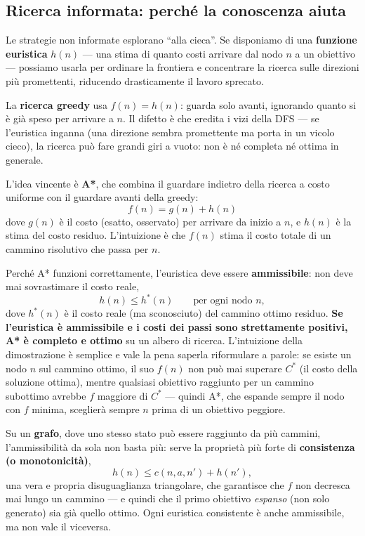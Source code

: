 \documentclass[11pt,a4paper]{article}
\begin{document}
\subsection{Ricerca informata: perché la conoscenza aiuta}

Le strategie non informate esplorano ``alla cieca''. Se disponiamo di una \textbf{funzione euristica} $h(n)$ --- una stima di quanto costi arrivare dal nodo $n$ a un obiettivo --- possiamo usarla per ordinare la frontiera e concentrare la ricerca sulle direzioni più promettenti, riducendo drasticamente il lavoro sprecato.

La \textbf{ricerca greedy} usa $f(n)=h(n)$: guarda solo avanti, ignorando quanto si è già speso per arrivare a $n$. Il difetto è che eredita i vizi della DFS --- se l'euristica inganna (una direzione sembra promettente ma porta in un vicolo cieco), la ricerca può fare grandi giri a vuoto: non è né completa né ottima in generale.

L'idea vincente è \textbf{A*}, che combina il guardare indietro della ricerca a costo uniforme con il guardare avanti della greedy:
\[
f(n) = g(n) + h(n)
\]
dove $g(n)$ è il costo (esatto, osservato) per arrivare da inizio a $n$, e $h(n)$ è la stima del costo residuo. L'intuizione è che $f(n)$ stima il costo totale di un cammino risolutivo che passa per $n$.

Perché A* funzioni correttamente, l'euristica deve essere \textbf{ammissibile}: non deve mai sovrastimare il costo reale,
\[
h(n) \le h^*(n) \qquad \text{per ogni nodo } n,
\]
dove $h^*(n)$ è il costo reale (ma sconosciuto) del cammino ottimo residuo. \textbf{Se l'euristica è ammissibile e i costi dei passi sono strettamente positivi, A* è completo e ottimo} su un albero di ricerca. L'intuizione della dimostrazione è semplice e vale la pena saperla riformulare a parole: se esiste un nodo $n$ sul cammino ottimo, il suo $f(n)$ non può mai superare $C^*$ (il costo della soluzione ottima), mentre qualsiasi obiettivo raggiunto per un cammino subottimo avrebbe $f$ maggiore di $C^*$ --- quindi A*, che espande sempre il nodo con $f$ minima, sceglierà sempre $n$ prima di un obiettivo peggiore.

Su un \textbf{grafo}, dove uno stesso stato può essere raggiunto da più cammini, l'ammissibilità da sola non basta più: serve la proprietà più forte di \textbf{consistenza (o monotonicità)},
\[
h(n) \le c(n,a,n') + h(n'),
\]
una vera e propria disuguaglianza triangolare, che garantisce che $f$ non decresca mai lungo un cammino --- e quindi che il primo obiettivo \emph{espanso} (non solo generato) sia già quello ottimo. Ogni euristica consistente è anche ammissibile, ma non vale il viceversa.
\end{document}
